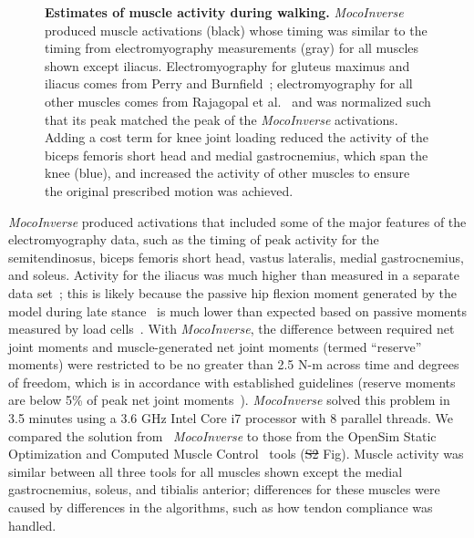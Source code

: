 \documentclass[10pt,letterpaper]{article}
\providecommand{\DIFaddtex}[1]{{\protect\color{blue}\uwave{#1}}} %
\providecommand{\DIFdeltex}[1]{{\protect\color{red}\sout{#1}}}                      %
\providecommand{\DIFaddbegin}{} %
\providecommand{\DIFaddend}{} %
\providecommand{\DIFdelbegin}{} %
\providecommand{\DIFdelend}{} %
\providecommand{\DIFadd}[1]{\texorpdfstring{\DIFaddtex{#1}}{#1}} %
\providecommand{\DIFdel}[1]{\texorpdfstring{\DIFdeltex{#1}}{}} %
\newcommand{\DIFscaledelfig}{0.5}
\newlength{\DIFdelgraphicswidth} %
\newlength{\DIFdelgraphicsheight} %
\newcommand{\DIFaddincludegraphics}[2][]{{\color{blue}\fbox{\DIFOincludegraphics[#1]{#2}}}} %
\newcommand{\DIFdelincludegraphics}[2][]{%
\sbox{\DIFdelgraphicsbox}{\DIFOincludegraphics[#1]{#2}}%
\settoboxwidth{\DIFdelgraphicswidth}{\DIFdelgraphicsbox} %
\settoboxtotalheight{\DIFdelgraphicsheight}{\DIFdelgraphicsbox} %
\scalebox{\DIFscaledelfig}{%
\parbox[b]{\DIFdelgraphicswidth}{\usebox{\DIFdelgraphicsbox}\\[-\baselineskip] \rule{\DIFdelgraphicswidth}{0em}}\llap{\resizebox{\DIFdelgraphicswidth}{\DIFdelgraphicsheight}{%
\setlength{\unitlength}{\DIFdelgraphicswidth}%
\begin{picture}(1,1)%
\thicklines\linethickness{2pt} %
{\color[rgb]{1,0,0}\put(0,0){\framebox(1,1){}}}%
{\color[rgb]{1,0,0}\put(0,0){\line( 1,1){1}}}%
{\color[rgb]{1,0,0}\put(0,1){\line(1,-1){1}}}%
\end{picture}%
}\hspace*{3pt}}} %
} %
\DeclareRobustCommand{\DIFaddbegin}{\DIFOaddbegin \let\includegraphics\DIFaddincludegraphics} %
\DeclareRobustCommand{\DIFaddend}{\DIFOaddend \let\includegraphics\DIFOincludegraphics} %
\DeclareRobustCommand{\DIFdelbegin}{\DIFOdelbegin \let\includegraphics\DIFdelincludegraphics} %
\DeclareRobustCommand{\DIFdelend}{\DIFOaddend \let\includegraphics\DIFOincludegraphics} %
\begin{document}
\begin{figure}[!h]
    \centering
    \caption{{\bf Estimates of muscle activity during walking.}
        \textit{MocoInverse} produced muscle activations (black) whose timing was similar to the timing from electromyography measurements (gray) for all muscles shown except iliacus. Electromyography for gluteus maximus and iliacus comes from Perry and Burnfield~\cite{Perry:2010}; electromyography for all other muscles comes from Rajagopal et al.~\cite{Rajagopal:2016ek} and was normalized such that its peak matched the peak of the \textit{MocoInverse} activations. Adding a cost term for knee joint loading reduced the activity of the biceps femoris short head and medial gastrocnemius, which span the knee (blue), and increased the activity of other muscles to ensure the original prescribed motion was achieved.
    }
    \label{walking}
\end{figure}

\textit{MocoInverse} produced activations that included some of the major features of the electromyography data, such as the timing of peak activity for the semitendinosus, biceps femoris short head, vastus lateralis, medial gastrocnemius, and soleus. Activity for the iliacus was much higher than measured in a separate data set~\cite{Perry:2010}; this is likely because the passive hip flexion moment generated by the model during late stance~\cite{Rajagopal:2016ek} is much lower than expected based on passive moments measured by load cells~\cite{Whittington:2008jia}. With \textit{MocoInverse}, the difference between required net joint moments and muscle-generated net joint moments (termed ``reserve'' moments) were restricted to be no greater than 2.5 N-m across time and degrees of freedom, which is in accordance with established guidelines (reserve moments are below 5\% of peak net joint moments~\cite{Hicks:2015bo}). \textit{MocoInverse} solved this problem in 3.5 minutes using a 3.6 GHz Intel Core i7 processor with 8 parallel threads. We compared the solution from ~\textit{MocoInverse} to those from the OpenSim Static Optimization and Computed Muscle Control~\cite{Thelen:2003bba} tools (\DIFdelbegin \DIFdel{S2 }\DIFdelend \DIFaddbegin \DIFadd{S1 }\DIFaddend Fig). Muscle activity was similar between all three tools for all muscles shown except the medial gastrocnemius, soleus, and tibialis anterior; differences for these muscles were caused by differences in the algorithms, such as how tendon compliance was handled.
\end{document}
